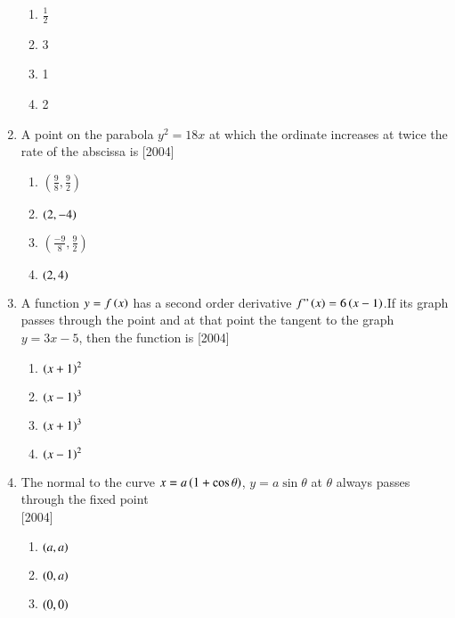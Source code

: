 \documentclass[journal,12pt,twocolumn]{IEEEtran}
\theoremstyle{remark}
\begin{document}
\begin{enumerate}
\begin{multicols}{2}
\begin{enumerate}
				           \item $\frac{1}{2}$
					          \item 3
						         \item 1
							        \item 2
								\end{enumerate}
								\end{multicols}
								\item A point on the parabola $y^2=18x$ at which the ordinate increases at twice the rate of the abscissa is \hfill{[2004]}
								\begin{multicols}{2}
								\begin{enumerate}
								    \item $(\frac{9}{8},\frac{9}{2})$
								        \item $\left(2,-4\right)$
									    \item $(\frac{-9}{8},\frac{9}{2})$
									        \item $\left(2,4\right)$
										\end{enumerate}
										\end{multicols}
										\item A function $y=f\left(x\right)$ has a second order derivative $f"\left(x\right)=6\left(x-1\right)$.If its graph passes through the point  and at that point the tangent to the graph $y=3x-5$, then the function is \hfill{[2004]}
										\begin{multicols}{2}
										\begin{enumerate}
										    \item $\left(x+1\right)^2$
										        \item $\left(x-1\right)^3$
											    \item $\left(x+1\right)^3$
											        \item $\left(x-1\right)^2$
												\end{enumerate}
												\end{multicols}
												\item The normal to the curve $x=a\left(1+\cos\theta\right)$, $y=a \sin\theta$ at $\theta$ always passes through the fixed point\\ \hfill{[2004]}
												\begin{multicols}{2}
												\begin{enumerate}
												    \item $\left(a,a\right)$
												        \item $\left(0,a\right)$
													    \item $\left(0,0\right)$

\end{enumerate}
\end{multicols}
\end{enumerate}
\end{document}
